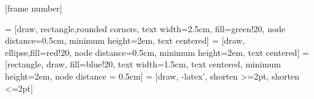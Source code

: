 \usepackage[french]{babel}
\usepackage{lmodern}
\usepackage{graphicx}
\usepackage{xcolor}
\usepackage{textcomp} 
\usepackage{amsmath, amsfonts, amssymb, amsthm}
\usepackage{booktabs,multirow}
\usepackage{setspace}
\usepackage{float}
\usepackage{pgfpages}
\usepackage{colortbl}
\usepackage{epstopdf}
\usepackage{framed}
\usepackage{etoolbox}
\usepackage{tikz}
\usepackage{csquotes}



[frame number]

\usetikzlibrary{shapes,arrows,calc, positioning}
 = [draw, rectangle,rounded corners, text width=2.5cm, fill=green!20, node distance=0.5cm, minimum height=2em, text centered]
 = [draw, ellipse,fill=red!20, node distance=0.5cm, minimum height=2em, text centered]
 = [rectangle, draw, fill=blue!20, 
    text width=1.5cm, text centered, minimum height=2em, node distance = 0.5cm]
 = [draw, -latex', shorten >=2pt, shorten <=2pt]

\AtBeginSection[]
{\ifnum \thesection>0
  \begin{frame}
  \vfill
  \begin{center}
  \LARGE
  \textcolor{grayInsee}{\insertsectionhead}
  \end{center}
  \vfill
  \end{frame}
\else
\fi
\subsection*{\secname}
}
\AtBeginSubsection[]{}


